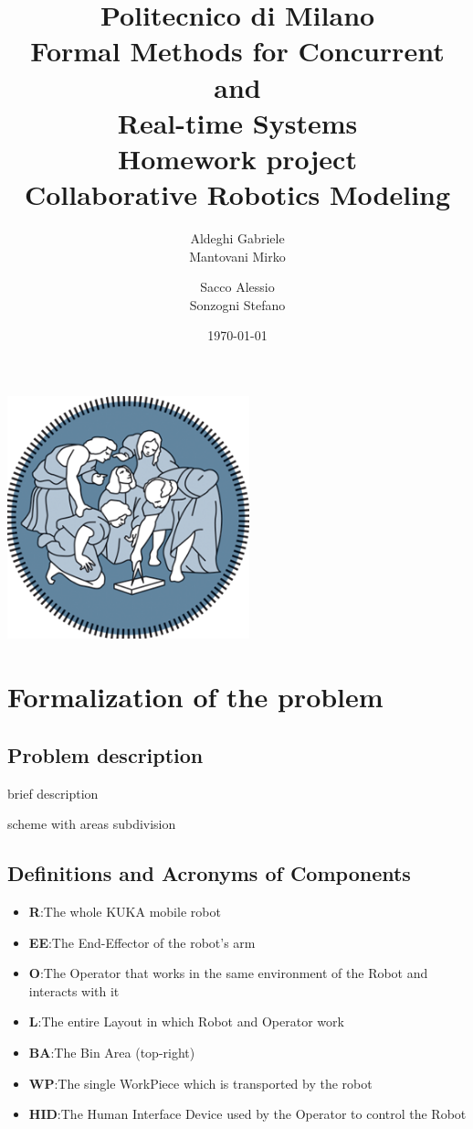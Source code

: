 \documentclass[a4paper]{article}
\title{Politecnico di Milano\\
Formal Methods for Concurrent \\
and \\
Real-time Systems\\
Homework project\\
\textbf{Collaborative Robotics Modeling }}
\author{Aldeghi Gabriele \\
  Mantovani Mirko \and
  Sacco Alessio \\
  Sonzogni Stefano}
\date{\today}
\begin{document}
\maketitle
\begin{center}
    \includegraphics[width=7cm]{images/polimi-logo}
\end{center}
\clearpage
{\hypersetup{hidelinks}\tableofcontents}
\clearpage

\section{Formalization of the problem}
\subsection{Problem description}
brief description

scheme with areas subdivision
\subsection{Definitions and Acronyms of Components}
\begin{itemize}
    \item \textbf{R}:\@ The whole KUKA mobile robot
    \item \textbf{EE}:\@ The End-Effector of the robot's arm
    \item \textbf{O}:\@ The Operator that works in the same environment of the Robot and interacts with it
    \item \textbf{L}:\@ The entire Layout in which Robot and Operator work
    \item \textbf{BA}:\@ The Bin Area (top-right)
    \item \textbf{WP}:\@ The single WorkPiece which is transported by the robot
    \item \textbf{HID}:\@ The Human Interface Device used by the Operator to control the Robot
\end{itemize}
\end{document}
